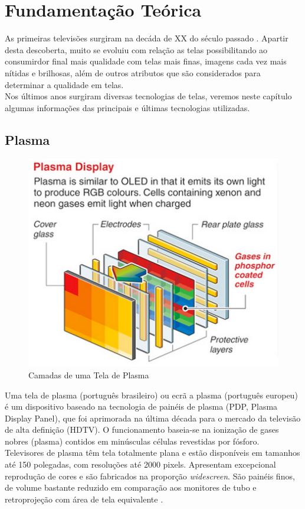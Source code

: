 \chapter{Fundamentação Teórica}
\label{cap:fundamentacao}

As primeiras televisões surgiram na decáda de XX do século passado \cite{WikipediaTelevisao}. Apartir desta descoberta, muito se evoluiu com relação as telas possibilitando ao consumirdor final mais qualidade com telas mais finas, imagens cada vez mais nítidas e brilhosas, além de outros atributos que são considerados para determinar a qualidade em telas.\\

Nos últimos anos surgiram diversas tecnologias de telas, veremos neste capítulo algumas informações das principais e últimas tecnologias utilizadas.

\section{Plasma}
\label{sec:plasma}

\begin{figure}[!ht]
  \centering
  \includegraphics[width=.40\textwidth]{./figuras/camadas_plasma} 
  \caption{Camadas de uma Tela de Plasma}
  \label{fig:camadas_plasma} 
\end{figure}

Uma tela de plasma (português brasileiro) ou ecrã a plasma (português europeu) é um dispositivo baseado na tecnologia de painéis de plasma (PDP, Plasma Display Panel), que foi aprimorada na última década para o mercado da televisão de alta definição (HDTV). O funcionamento baseia-se na ionização de gases nobres (plasma) contidos em minúsculas células revestidas por fósforo.\\

Televisores de plasma têm tela totalmente plana e estão disponíveis em tamanhos até 150 polegadas, com resoluções até 2000 pixels. Apresentam excepcional reprodução de cores e são fabricados na proporção \textit{widescreen}. São painéis finos, de volume bastante reduzido em comparação aos monitores de tubo e retroprojeção com área de tela equivalente \cite{WikipediaTelaPlasma}. \\

